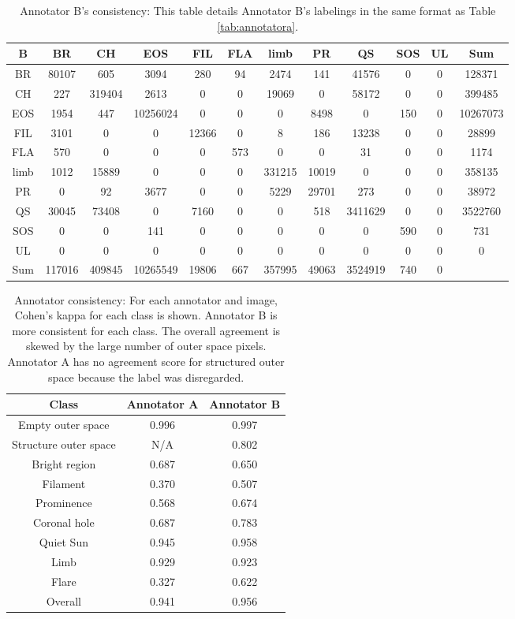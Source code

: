 \documentclass[twoside]{report}
\begin{document}
\begin{table}[ht!]
\centering
 \begin{tabular}{|c |c c c c c c c c c c | c|} 
 \hline
\textbf{B} & BR & CH & EOS & FIL & FLA & limb & PR & QS & SOS & UL & Sum \\ \hline
BR & 80107 & 605 & 3094 & 280 & 94 & 2474 & 141 & 41576 & 0 & 0 & 128371\\
CH & 227 & 319404 & 2613 & 0 & 0 & 19069 & 0 & 58172 & 0 & 0 & 399485\\
EOS & 1954 & 447 & 10256024 & 0 & 0 & 0 & 8498 & 0 & 150 & 0 & 10267073\\
FIL & 3101 & 0 & 0 & 12366 & 0 & 8 & 186 & 13238 & 0 & 0 & 28899\\
FLA & 570 & 0 & 0 & 0 & 573 & 0 & 0 & 31 & 0 & 0 & 1174\\
limb & 1012 & 15889 & 0 & 0 & 0 & 331215 & 10019 & 0 & 0 & 0 & 358135\\
PR & 0 & 92 & 3677 & 0 & 0 & 5229 & 29701 & 273 & 0 & 0 & 38972\\
QS & 30045 & 73408 & 0 & 7160 & 0 & 0 & 518 & 3411629 & 0 & 0 & 3522760\\
SOS & 0 & 0 & 141 & 0 & 0 & 0 & 0 & 0 & 590 & 0 & 731\\
UL & 0 & 0 & 0 & 0 & 0 & 0 & 0 & 0 & 0 & 0 & 0\\
Sum & 117016 & 409845 & 10265549 & 19806 & 667 & 357995 & 49063 & 3524919 & 740 & 0 &\\
 \hline
 \end{tabular}
 \caption{Annotator B's consistency: This table details Annotator B's labelings in the same format as Table \ref{tab:annotatora}.}
 \label{tab:annotatorb}
\end{table}

\begin{table}[ht!]
\centering
 \begin{tabular}{|c c c|} 
 \hline
 Class & Annotator A & Annotator B \\
   \hline\hline
Empty outer space & 0.996 & 0.997 \\
Structure outer space & N/A & 0.802 \\
Bright region & 0.687 & 0.650 \\
Filament & 0.370 & 0.507 \\
Prominence & 0.568 & 0.674 \\
Coronal hole & 0.687 & 0.783 \\ 
Quiet Sun & 0.945 & 0.958 \\
Limb & 0.929 & 0.923 \\
Flare & 0.327 & 0.622 \\ \hline
Overall & 0.941 &  0.956\\
 \hline
 \end{tabular}
 \caption{Annotator consistency: For each annotator and image, Cohen's kappa for each class is shown. Annotator B is more consistent for each class. The overall agreement is skewed by the large number of outer space pixels. Annotator A has no agreement score for structured outer space because the label was disregarded.}
 \label{tab:annotatorconsistency}
\end{table}
\end{document}
